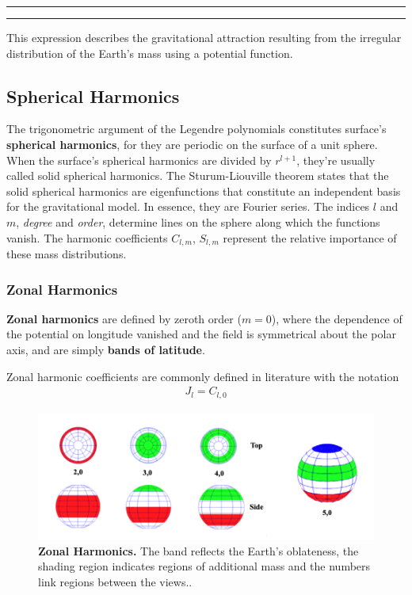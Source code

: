 \vspace{\belowdisplayskip}\hspace{9.2cm}
\rule[-6pt]{0.4pt}{6.4pt}%
\rule{\dimexpr(0.5\columnsep-0.4pt)}{0.4pt}%
\begin{multicols}{2}
This expression describes the gravitational attraction resulting from the irregular distribution of the Earth's mass using a potential function. 



\subsection{Spherical Harmonics}
The trigonometric argument of the Legendre polynomials constitutes surface's \textbf{spherical harmonics}, for they are periodic on the surface of a unit sphere. When the surface's spherical harmonics are divided by $r^{l+1}$, they're usually called solid spherical harmonics. The Sturum-Liouville theorem states that the solid spherical harmonics are eigenfunctions that constitute an independent basis for the gravitational model. In essence, they are Fourier series. The indices $l$ and $m$, \textit{degree} and \textit{order}, determine lines on the sphere along which the functions vanish. The harmonic coefficients $C_{l,m}$, $S_{l,m}$ represent the relative importance of these mass distributions.

\subsubsection{Zonal Harmonics}
\textbf{Zonal harmonics} are defined by zeroth order ($m=0$), where the dependence of the potential on longitude vanished and the field is symmetrical about the polar axis, and are simply \textbf{bands of latitude}.\par

Zonal harmonic coefficients are commonly defined in literature with the notation 
\begin{gather}
    J_l = C_{l,0}
\end{gather}
\end{multicols}
\begin{figure}[H]
    \centering
    \includegraphics[width=.8\textwidth]{perturbation/zonal}
    \caption{\textbf{Zonal Harmonics.} The band reflects the Earth's oblateness, the shading region indicates regions of additional mass and the numbers link regions  between the views.\cite[]{}.}
    \label{fig:zonal}
\end{figure}

